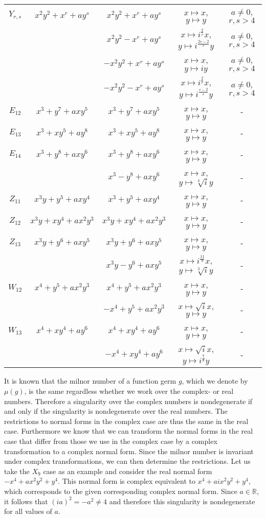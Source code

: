 \documentclass{amsproc}
\begin{document}
\begin{table}[!hbp]
\begin{tabular}{|c|c|c|c|c|}
\hline
$Y_{r,s}$&$x^2y^2+x^r+ay^s$&$x^2y^2+x^r+ay^s$&$x\mapsto x$, $y\mapsto y$&$a\neq 0$, $r,s>4$\\
&&$x^2y^2-x^r+ay^s$&$x\mapsto i^{\frac{2}{r}}x$, $y\mapsto i^{\frac{2r-2}{r}}y$&$a\neq 0$, $r,s>4$\\
&&$-x^2y^2+x^r+ay^s$&$x\mapsto x$, $y\mapsto iy$&$a\neq 0$, $r,s>4$\\
&&$-x^2y^2-x^r+ay^s$&$x\mapsto i^{\frac{2}{r}}x$, $y\mapsto i^{\frac{r-2}{r}}y$&$a\neq 0$, $r,s>4$\\
\hline
$E_{12}$&$x^3+y^7+axy^5$&$x^3+y^7+axy^5$&$x\mapsto x$, $y\mapsto y$&-\\
\hline
$E_{13}$&$x^3+xy^5+ay^8$&$x^3+xy^5+ay^8$&$x\mapsto x$, $y\mapsto y$&-\\
\hline
$E_{14}$&$x^3+y^8+axy^6$&$x^3+y^8+axy^6$&$x\mapsto x$, $y\mapsto y$&-\\
&&$x^3-y^8+axy^6$&$x\mapsto x$, $y\mapsto \sqrt[4]iy$&-\\
\hline
$Z_{11}$&$x^3y+y^5+axy^4$&$x^3+y^5+axy^4$&$x\mapsto x$, $y\mapsto y$&-\\
\hline
$Z_{12}$&$x^3y+xy^4+ax^2y^3$&$x^3y+xy^4+ax^2y^3$&$x\mapsto x$, $y\mapsto y$&-\\
\hline
$Z_{13}$&$x^3y+y^6+axy^5$&$x^3y+y^6+axy^5$&$x\mapsto x$, $y\mapsto y$& -\\
&&$x^3y-y^6+axy^5$&$x\mapsto i^{\frac{11}{9}}x$, $y\mapsto \sqrt[3]i y$& -\\
\hline
$W_{12}$&$x^4+y^5+ax^2y^3$&$x^4+y^5+ax^2y^3$&$x\mapsto x$, $y\mapsto y$&-\\
&&$-x^4+y^5+ax^2y^3$&$x\mapsto\sqrt{i} x$, $y\mapsto y$&-\\
\hline
$W_{13}$&$x^4+xy^4+ay^6$&$x^4+xy^4+ay^6$&$x\mapsto x$, $y\mapsto y$&-\\
&&$-x^4+xy^4+ay^6$&$x\mapsto \sqrt{i}x$, $y\mapsto i^{\frac{7}{8}}y$&-\\
\hline
\end{tabular}
\end{table}

It is known that the milnor number of a function germ $g$, which we denote by $\mu(g)$, is the same regardless whether we work over the complex- or real numbers. Therefore a singularity over the complex numbers is nondegenerate if and only if the singularity is nondegenerate over the real numbers. The restrictions to normal forms in the complex case are thus the same in the real case. Furthermore we know that we can transform the normal forms in the real case that differ from those we use in the complex case by a complex transformation to a complex normal form. Since the milnor number is invariant under complex transformations, we can then determine the restrictions. Let us take the $X_9$ case as an example and consider the real normal form $-x^4+ax^2y^2+y^4$. This normal form is complex equivalent to $x^4+aix^2y^2+y^4$, which corresponds to the given corresponding complex normal form. Since $a\in\mathbb R$, it follows that $(ia)^2=-a^2\neq4$ and therefore this singularity is nondegenerate for all values of $a$.
\end{document}
